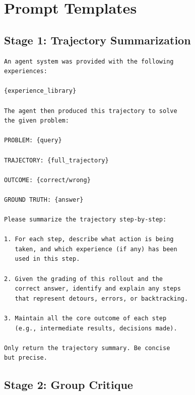 \section{Prompt Templates}


\subsection{Stage 1: Trajectory Summarization}

\begin{lstlisting}[caption=Full Summarization Prompt]
An agent system was provided with the following 
experiences:

{experience_library}

The agent then produced this trajectory to solve 
the given problem:

PROBLEM: {query}

TRAJECTORY: {full_trajectory}

OUTCOME: {correct/wrong}

GROUND TRUTH: {answer}

Please summarize the trajectory step-by-step:

1. For each step, describe what action is being 
   taken, and which experience (if any) has been 
   used in this step.

2. Given the grading of this rollout and the 
   correct answer, identify and explain any steps 
   that represent detours, errors, or backtracking.

3. Maintain all the core outcome of each step 
   (e.g., intermediate results, decisions made).

Only return the trajectory summary. Be concise 
but precise.
\end{lstlisting}

\subsection{Stage 2: Group Critique}

